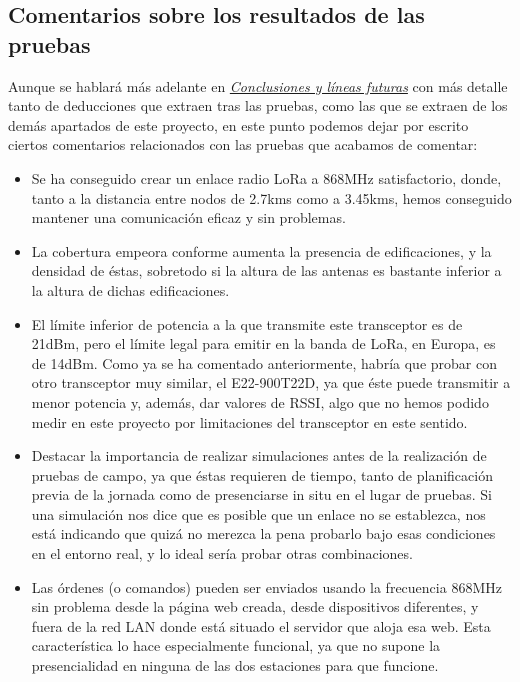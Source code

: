 \documentclass[12pt]{article}
\begin{document}
	\pagebreak
	
	\subsection[Comentarios sobre los resultados de las pruebas]{Comentarios sobre los resultados de las pruebas}
	
	\noindent Aunque se hablará más adelante en \hyperref[sec: conclusiones]{\textit{Conclusiones y líneas futuras}} con más detalle tanto de deducciones que extraen tras las pruebas, como las que se extraen de los demás apartados de este proyecto, en este punto podemos dejar por escrito ciertos comentarios relacionados con las pruebas que acabamos de comentar: 
	
	\begin{itemize}
		\item Se ha conseguido crear un enlace radio LoRa a 868MHz satisfactorio, donde, tanto a la distancia entre nodos de 2.7kms como a 3.45kms, hemos conseguido mantener una comunicación eficaz y sin problemas.
		\item La cobertura empeora conforme aumenta la presencia de edificaciones, y la densidad de éstas, sobretodo si la altura de las antenas es bastante inferior a la altura de dichas edificaciones.
		\item El límite inferior de potencia a la que transmite este transceptor es de 21dBm, pero el límite legal para emitir en la banda de LoRa, en Europa, es de 14dBm. Como ya se ha comentado anteriormente, habría que probar con otro transceptor muy similar, el E22-900T22D, ya que éste puede transmitir a menor potencia y, además, dar valores de RSSI, algo que no hemos podido medir en este proyecto por limitaciones del transceptor en este sentido.
		\item Destacar la importancia de realizar simulaciones antes de la realización de pruebas de campo, ya que éstas requieren de tiempo, tanto de planificación previa de la jornada como de presenciarse in situ en el lugar de pruebas. Si una simulación nos dice que es posible que un enlace no se establezca, nos está indicando que quizá no merezca la pena probarlo bajo esas condiciones en el entorno real, y lo ideal sería probar otras combinaciones.
		\item Las órdenes (o comandos) pueden ser enviados usando la frecuencia 868MHz sin problema desde la página web creada, desde dispositivos diferentes, y fuera de la red LAN donde está situado el servidor que aloja esa web. Esta característica lo hace especialmente funcional, ya que no supone la presencialidad en ninguna de las dos estaciones para que funcione.

\end{itemize}
\end{document}
